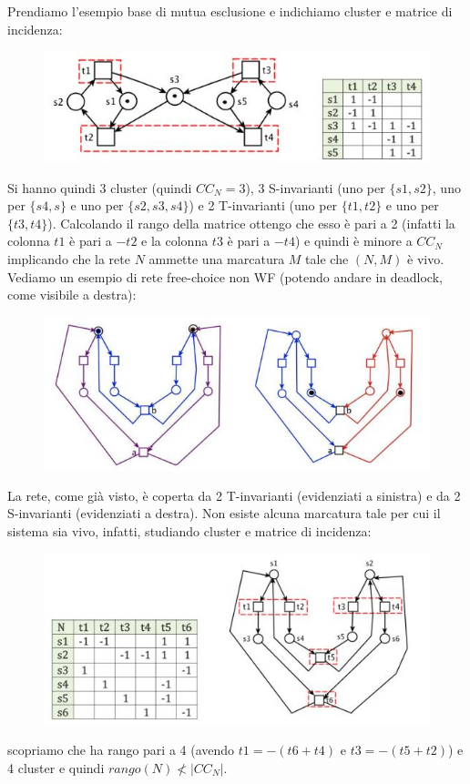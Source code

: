 \documentclass[a4paper,12pt, oneside]{book}
\begin{document}
\begin{esempio}
  Prendiamo l'esempio base di mutua esclusione e indichiamo cluster e matrice di
  incidenza:
  \begin{figure}[H]
    \centering
    \includegraphics[scale = 0.7]{img/cc3.jpg}
  \end{figure}
  Si hanno quindi 3 cluster (quindi $CC_N=3$), 3 S-invarianti (uno per
  $\{s1,s2\}$, uno per $\{s4,s\}$ e uno per $\{s2,s3,s4\}$) e 2 T-invarianti
  (uno per $\{t1,t2\}$ e uno per $\{t3,t4\}$). Calcolando il rango della matrice
  ottengo che esso è pari a 2 (infatti la colonna $t1$ è pari a $-t2$ e la
  colonna $t3$ è pari a $-t4$) e quindi è minore a $CC_N$ implicando che la rete
  $N$ ammette una marcatura $M$ tale che $(N, M)$ è vivo. \\
  Vediamo un esempio di rete free-choice non WF (potendo andare in deadlock,
  come visibile a destra):
  \begin{figure}[H]
    \centering
    \includegraphics[scale = 0.6]{img/cc4.jpg}
  \end{figure}
  La rete, come già visto, è coperta da 2 T-invarianti (evidenziati a sinistra)
  e da 2 S-invarianti (evidenziati a destra). Non esiste alcuna marcatura tale
  per cui il sistema sia vivo, infatti, studiando cluster e matrice di
  incidenza: 
  \begin{figure}[H]
    \centering
    \includegraphics[scale = 0.6]{img/cc5.jpg}
  \end{figure}
  scopriamo che ha rango pari a 4 (avendo $t1=-(t6+t4)$ e $t3=-(t5+t2)$) e 4
  cluster e quindi $rango(N)\not < |CC_N|$.
\end{esempio}
\end{document}
